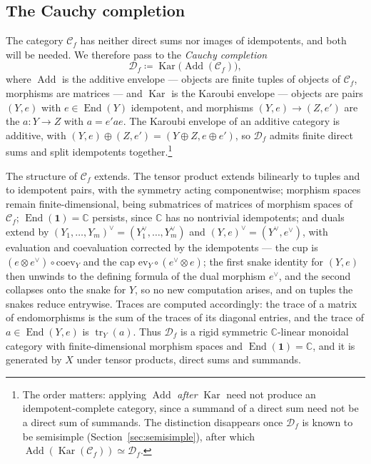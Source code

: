 \documentclass[11pt]{article}
\newcommand{\conncat}{\mathcal{C}_{f}}            %
\newcommand{\cauchy}{\mathcal{D}_{f}}             %
\newcommand{\unitobj}{\mathbf{1}}                 %
\newcommand{\genX}{X}                             %
\newcommand{\Kar}{\operatorname{Kar}}
\newcommand{\Add}{\operatorname{Add}}
\newcommand{\End}{\operatorname{End}}
\newcommand{\tr}{\operatorname{tr}}
\begin{document}
\subsection{The Cauchy completion}\label{subsec:cauchy}

The category $\conncat$ has neither direct sums nor images of
idempotents, and both will be needed. We therefore pass to the
\emph{Cauchy completion}
\[
\cauchy\coloneqq\Kar\bigl(\Add(\conncat)\bigr),
\]
where $\Add$ is the additive envelope --- objects are finite tuples
of objects of $\conncat$, morphisms are matrices --- and $\Kar$ is
the Karoubi envelope --- objects are pairs $(Y,e)$ with
$e\in\End(Y)$ idempotent, and morphisms $(Y,e)\to(Z,e')$ are the
$a\colon Y\to Z$ with $a=e'ae$. The Karoubi envelope of an additive
category is additive, with $(Y,e)\oplus(Z,e')=(Y\oplus Z,e\oplus
e')$, so $\cauchy$ admits finite direct sums and split idempotents
together.\footnote{The order matters: applying $\Add$ \emph{after}
$\Kar$ need not produce an idempotent-complete category, since a
summand of a direct sum need not be a direct sum of summands. The
distinction disappears once $\cauchy$ is known to be semisimple
(Section~\ref{sec:semisimple}), after which
$\Add(\Kar(\conncat))\simeq\cauchy$.}

The structure of $\conncat$ extends. The tensor product extends
bilinearly to tuples and to idempotent pairs, with the symmetry
acting componentwise; morphism spaces remain finite-dimensional,
being submatrices of matrices of morphism spaces of $\conncat$;
$\End(\unitobj)=\mathbb{C}$ persists, since $\mathbb{C}$ has no
nontrivial idempotents; and duals extend by
$(Y_{1},\dotsc,Y_{m})^{\vee}=(Y_{1}^{\vee},\dotsc,Y_{m}^{\vee})$
and $(Y,e)^{\vee}=(Y^{\vee},e^{\vee})$, with evaluation and
coevaluation corrected by the idempotents --- the cup is
$(e\otimes e^{\vee})\circ\mathrm{coev}_{Y}$ and the cap
$\mathrm{ev}_{Y}\circ(e^{\vee}\otimes e)$; the first snake
identity for $(Y,e)$ then unwinds to the defining formula of the
dual morphism $e^{\vee}$, and the second collapses onto the snake for
$Y$, so no new computation arises, and on tuples the snakes
reduce entrywise. Traces are computed accordingly:
the trace of a matrix of endomorphisms is the sum of the traces of
its diagonal entries, and the trace of $a\in\End(Y,e)$ is
$\tr_{Y}(a)$. Thus $\cauchy$ is a rigid symmetric
$\mathbb{C}$-linear monoidal category with finite-dimensional
morphism spaces and $\End(\unitobj)=\mathbb{C}$, and it is
generated by $\genX$
under tensor products, direct sums and summands.
\end{document}

